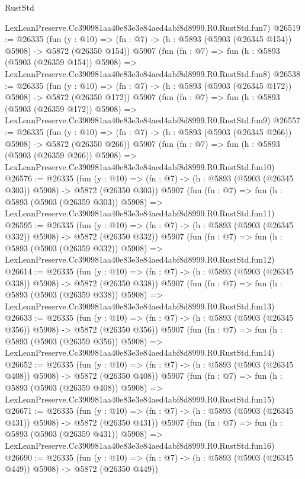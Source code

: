 \begin{lexlean}{RustStd}
\begin{coremodule}
    LexLeanPreserve.Cc390981aa40e83e3e84aed4abf8d8999.R0.RustStd.fun7)
@26519 := @26335
    (fun (y : @10) => (fn : @7) -> (h : @5893 (@5903 (@26345 @154)) @5908) -> @5872 (@26350 @154))
    @5907
    (fun (fn : @7) =>
    fun (h : @5893 (@5903 (@26359 @154)) @5908) =>
    LexLeanPreserve.Cc390981aa40e83e3e84aed4abf8d8999.R0.RustStd.fun8)
@26538 := @26335
    (fun (y : @10) => (fn : @7) -> (h : @5893 (@5903 (@26345 @172)) @5908) -> @5872 (@26350 @172))
    @5907
    (fun (fn : @7) =>
    fun (h : @5893 (@5903 (@26359 @172)) @5908) =>
    LexLeanPreserve.Cc390981aa40e83e3e84aed4abf8d8999.R0.RustStd.fun9)
@26557 := @26335
    (fun (y : @10) => (fn : @7) -> (h : @5893 (@5903 (@26345 @266)) @5908) -> @5872 (@26350 @266))
    @5907
    (fun (fn : @7) =>
    fun (h : @5893 (@5903 (@26359 @266)) @5908) =>
    LexLeanPreserve.Cc390981aa40e83e3e84aed4abf8d8999.R0.RustStd.fun10)
@26576 := @26335
    (fun (y : @10) => (fn : @7) -> (h : @5893 (@5903 (@26345 @303)) @5908) -> @5872 (@26350 @303))
    @5907
    (fun (fn : @7) =>
    fun (h : @5893 (@5903 (@26359 @303)) @5908) =>
    LexLeanPreserve.Cc390981aa40e83e3e84aed4abf8d8999.R0.RustStd.fun11)
@26595 := @26335
    (fun (y : @10) => (fn : @7) -> (h : @5893 (@5903 (@26345 @332)) @5908) -> @5872 (@26350 @332))
    @5907
    (fun (fn : @7) =>
    fun (h : @5893 (@5903 (@26359 @332)) @5908) =>
    LexLeanPreserve.Cc390981aa40e83e3e84aed4abf8d8999.R0.RustStd.fun12)
@26614 := @26335
    (fun (y : @10) => (fn : @7) -> (h : @5893 (@5903 (@26345 @338)) @5908) -> @5872 (@26350 @338))
    @5907
    (fun (fn : @7) =>
    fun (h : @5893 (@5903 (@26359 @338)) @5908) =>
    LexLeanPreserve.Cc390981aa40e83e3e84aed4abf8d8999.R0.RustStd.fun13)
@26633 := @26335
    (fun (y : @10) => (fn : @7) -> (h : @5893 (@5903 (@26345 @356)) @5908) -> @5872 (@26350 @356))
    @5907
    (fun (fn : @7) =>
    fun (h : @5893 (@5903 (@26359 @356)) @5908) =>
    LexLeanPreserve.Cc390981aa40e83e3e84aed4abf8d8999.R0.RustStd.fun14)
@26652 := @26335
    (fun (y : @10) => (fn : @7) -> (h : @5893 (@5903 (@26345 @408)) @5908) -> @5872 (@26350 @408))
    @5907
    (fun (fn : @7) =>
    fun (h : @5893 (@5903 (@26359 @408)) @5908) =>
    LexLeanPreserve.Cc390981aa40e83e3e84aed4abf8d8999.R0.RustStd.fun15)
@26671 := @26335
    (fun (y : @10) => (fn : @7) -> (h : @5893 (@5903 (@26345 @431)) @5908) -> @5872 (@26350 @431))
    @5907
    (fun (fn : @7) =>
    fun (h : @5893 (@5903 (@26359 @431)) @5908) =>
    LexLeanPreserve.Cc390981aa40e83e3e84aed4abf8d8999.R0.RustStd.fun16)
@26690 := @26335
    (fun (y : @10) => (fn : @7) -> (h : @5893 (@5903 (@26345 @449)) @5908) -> @5872 (@26350 @449))

\end{coremodule}
\end{lexlean}
